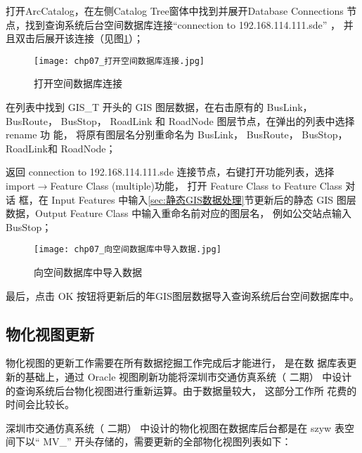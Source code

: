 \begin{nbeae}
\item 打开ArcCatalog，在左侧Catalog Tree窗体中找到并展开Database
Connections 节点，找到查询系统后台空间数据库连接“connection to
192.168.114.111.sde” ， 并且双击后展开该连接（见图\ref{fig:chp07_打开空间数据库连接}）；

\begin{figure}[!ht]
  \centering
  \texttt{[image: chp07\_打开空间数据库连接.jpg]}
  \caption{打开空间数据库连接\label{fig:chp07_打开空间数据库连接} }
\end{figure}

\item 在列表中找到 GIS\_T 开头的 GIS 图层数据，在右击原有的 BusLink，BusRoute，
BusStop， RoadLink 和 RoadNode 图层节点，在弹出的列表中选择 rename 功
能， 将原有图层名分别重命名为 BusLink\pyear， BusRoute\pyear， BusStop\pyear，
RoadLink\pyear 和 RoadNode\pyear；

\item 返回 connection to 192.168.114.111.sde 连接节点，右键打开功能列表，选择
import$\rightarrow$Feature Class (multiple)功能， 打开 Feature Class to Feature Class 对话
框，在 Input Features 中输入\ref{sec:静态GIS数据处理}节更新后的静态 GIS 图层数据，Output Feature
Class 中输入重命名前对应的图层名， 例如公交站点输入 BusStop；

\begin{figure}[!ht]
  \centering
  \texttt{[image: chp07\_向空间数据库中导入数据.jpg]}
  \caption{向空间数据库中导入数据\label{fig:chp07_向空间数据库中导入数据} }
\end{figure}

\item 最后，点击 OK 按钮将更新后的\pyear 年GIS图层数据导入查询系统后台空间数据库中。
\end{nbeae}

\subsection{物化视图更新}
物化视图的更新工作需要在所有数据挖掘工作完成后才能进行， 是在数
据库表更新的基础上，通过 Oracle 视图刷新功能将深圳市交通仿真系统（ 二期）
中设计的查询系统后台物化视图进行重新运算。由于数据量较大， 这部分工作所
花费的时间会比较长。

深圳市交通仿真系统（ 二期） 中设计的物化视图在数据库后台都是在 szyw
表空间下以“ MV\_” 开头存储的，需要更新的全部物化视图列表如下：

